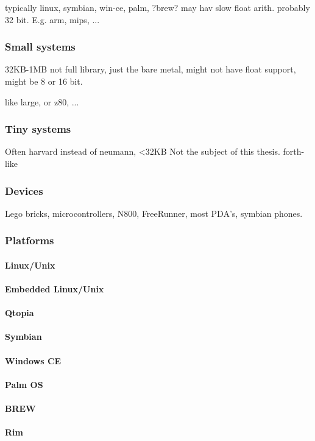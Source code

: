 typically linux, symbian, win-ce, palm, ?brew?
may hav slow float arith.
probably 32 bit.
E.g. arm, mips, ...


\subsubsection{Small systems}
32KB-1MB
not full library,
just the bare metal,
might not have float support,
might be 8 or 16 bit.

like large, or z80, ...
\subsubsection{Tiny systems}
Often harvard instead of neumann,
<32KB
Not the subject of this thesis.
forth-like

\subsubsection{Devices}
Lego bricks, microcontrollers, N800, FreeRunner, most PDA's, symbian phones.
\subsubsection{Platforms}
\paragraph{Linux/Unix}
\paragraph{Embedded Linux/Unix}
\paragraph{Qtopia}
\paragraph{Symbian}
\paragraph{Windows CE}
\paragraph{Palm OS}
\paragraph{BREW}
\paragraph{Rim}

